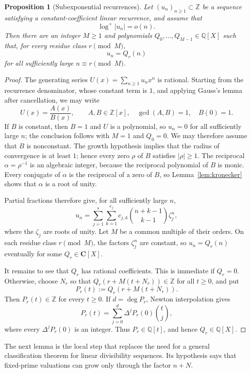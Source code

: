 \documentclass[11pt]{amsart}
\newtheorem{proposition}[theorem]{Proposition}
\theoremstyle{remark}
\numberwithin{equation}{section}
\newcommand{\Z}{\mathbb Z}
\newcommand{\Q}{\mathbb Q}
\begin{document}
\begin{proposition}[Subexponential recurrences]\label{prop:quasipolynomial}
Let $(u_n)_{n\ge 1}\subset\Z$ be a sequence satisfying a constant-coefficient
linear recurrence, and assume that
\[
  \log^+|u_n|=o(n).
\]
Then there are an integer $M\ge 1$ and polynomials
$Q_0,\dots,Q_{M-1}\in\Q[X]$ such that, for every residue class
$r\pmod M$,
\[
  u_n=Q_r(n)
\]
for all sufficiently large $n\equiv r\pmod M$.
\end{proposition}

\begin{proof}
The generating series $U(x)=\sum_{n\ge 1}u_n x^n$ is rational.  Starting from
the recurrence denominator, whose constant term is $1$, and applying Gauss's lemma
after cancellation, we may write
\[
  U(x)=\frac{A(x)}{B(x)},
  \qquad A,B\in\Z[x],\quad \gcd(A,B)=1,\quad B(0)=1.
\]
If $B$ is constant, then $B=1$ and $U$ is a polynomial, so $u_n=0$ for all
sufficiently large $n$; the conclusion follows with $M=1$ and $Q_0=0$.  We may
therefore assume that $B$ is nonconstant.  The growth hypothesis implies that the
radius of convergence is at least $1$; hence every zero $\rho$ of $B$ satisfies
$|\rho|\ge 1$.  The reciprocal $\alpha=\rho^{-1}$ is an algebraic integer,
because the reciprocal polynomial of $B$ is monic.  Every conjugate of $\alpha$
is the reciprocal of a zero of $B$, so Lemma~\ref{lem:kronecker} shows that
$\alpha$ is a root of unity.

Partial fractions therefore give, for all sufficiently large $n$,
\[
  u_n=\sum_{j=1}^s\sum_{k=1}^{e_j}
       c_{j,k}\binom{n+k-1}{k-1}\zeta_j^n,
\]
where the $\zeta_j$ are roots of unity.  Let $M$ be a common multiple of their
orders.  On each residue class $r\pmod M$, the factors $\zeta_j^n$ are
constant, so $u_n=Q_r(n)$ eventually for some $Q_r\in\mathbf C[X]$.

It remains to see that $Q_r$ has rational coefficients.  This is immediate if
$Q_r=0$.  Otherwise, choose $N_r$ so that
$Q_r(r+M(t+N_r))\in\Z$ for all $t\ge 0$, and put
\[
  P_r(t):=Q_r(r+M(t+N_r)).
\]
Then $P_r(t)\in\Z$ for every $t\ge 0$.  If $d=\deg P_r$, Newton interpolation
gives
\[
  P_r(t)=\sum_{j=0}^d \Delta^j P_r(0)\binom{t}{j},
\]
where every $\Delta^j P_r(0)$ is an integer.  Thus $P_r\in\Q[t]$, and hence
$Q_r\in\Q[X]$.
\end{proof}

The next lemma is the local step that replaces the need for a general
classification theorem for linear divisibility sequences.  Its hypothesis says that
fixed-prime valuations can grow only through the factor $n+N$.
\end{document}

